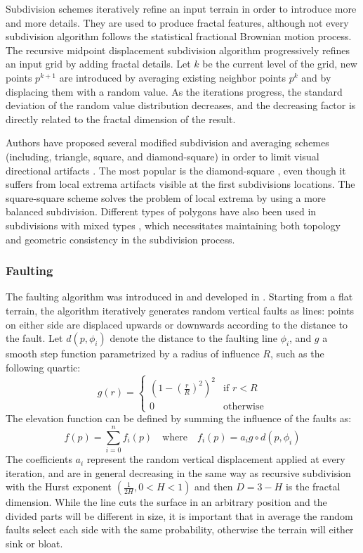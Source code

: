 \documentclass{article}
\begin{document}
Subdivision schemes iteratively refine an input terrain in order to introduce more and more details. They are used to produce fractal features, although not every subdivision algorithm follows the statistical fractional Brownian motion process. The recursive midpoint displacement subdivision algorithm \cite{FFC82a, FFC82b} progressively refines an input grid by adding fractal details. Let $k$ be the current level of the grid, new points $p^{k+1}$ are introduced by averaging existing neighbor points $p^k$ and by displacing them with a random value. As the iterations progress, the standard deviation of the random value distribution decreases, and the decreasing factor is directly related to the fractal dimension of the result.

Authors have proposed several modified subdivision and averaging schemes (including, triangle, square, and diamond-square) in order to limit visual directional artifacts \cite{Mil86, Lew87, Man88}. The most popular is the diamond-square \cite{FFC82b}, even though it suffers from local extrema artifacts visible at the first subdivisions locations. The square-square \cite{Mil86} scheme solves the problem of local extrema by using a more balanced subdivision. Different types of polygons have also been used in subdivisions with mixed types \cite{DKW94}, which necessitates maintaining both topology and geometric consistency in the subdivision process.

\subsubsection{Faulting}

The faulting algorithm was introduced in \cite{Man82} and developed in \cite{Vos91, EMP98}. Starting from a flat terrain, the algorithm iteratively generates random vertical faults as lines: points on either side are displaced upwards or downwards according to the distance to the fault. Let $d(p, \phi_i)$ denote the distance to the faulting line $\phi_i$, and $g$ a smooth step function parametrized by a radius of influence $R$, such as the following quartic:
\[
g(r) =
\begin{cases}
\left(1 - \left(\frac{r}{R}\right)^2\right)^2 & \text{if } r < R \\
0 & \text{otherwise}
\end{cases}
\]
The elevation function can be defined by summing the influence of the faults as:
\[
f(p) = \sum_{i=0}^{n} f_i(p) \quad \text{where} \quad f_i(p) = a_i g \circ d(p, \phi_i)
\]
The coefficients $a_i$ represent the random vertical displacement applied at every iteration, and are in general decreasing in the same way as recursive subdivision with the Hurst exponent $(\frac{1}{2H}, 0 < H < 1)$ and then $D = 3 - H$ is the fractal dimension. While the line cuts the surface in an arbitrary position and the divided parts will be different in size, it is important that in average the random faults select each side with the same probability, otherwise the terrain will either sink or bloat.
\end{document}

